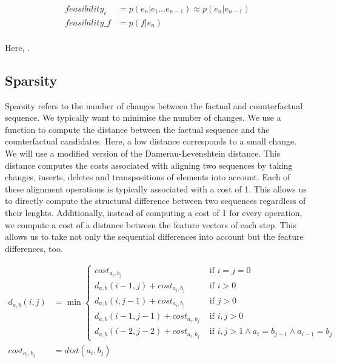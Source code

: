 \documentclass[./../../paper.tex]{subfiles}
\begin{document}
\begin{align}
    \label{eq:feasibility}
    feasibility_e  & =p(e_n|e_1\ldots e_{n-1}) \approx  p(e_n|e_{n-1}) \nonumber \\
    feasibility\_f & =p(f|e_n)                                                   \\
\end{align}

Here, .

\subsection{Sparsity}
Sparsity refers to the number of changes between the factual and counterfactual sequence. We typically want to minimise the number of changes. We use a function to compute the distance between the factual sequence and the counterfactual candidates. Here, a low distance corresponds to a small change. We will use a modified version of the Damerau-Levenshtein distance. This distance computes the costs associated with aligning two sequences by taking changes, inserts, deletes and transpositions of elements into account. Each of these alignment operations is typically associated with a cost of 1. This allows us to directly compute the structural difference between two sequences regardless of their lenghts. Additionally, instead of computing a cost of 1 for every operation, we compute a cost of a distance between the feature vectors of each step. This allows us to take not only the sequential differences into account but the feature differences, too.

\begin{align}
    d_{a, b}(i, j)  & =\min
    \begin{cases}
        cost_{a_i, b_j}                    & \text { if } i=j=0                                          \\
        d_{a, b}(i-1, j)+cost_{a_i, b_j}   & \text { if } i>0                                            \\
        d_{a, b}(i, j-1)+cost_{a_i, b_j}   & \text { if } j>0                                            \\
        d_{a, b}(i-1, j-1)+cost_{a_i, b_j} & \text { if } i, j>0                                         \\
        d_{a, b}(i-2, j-2)+cost_{a_i, b_j} & \text { if } i, j>1 \land a_{i}=b_{j-1} \land a_{i-1}=b_{j}
    \end{cases}          \\
    cost_{a_i, b_j} & = dist(a_i, b_j)
\end{align}
\end{document}
